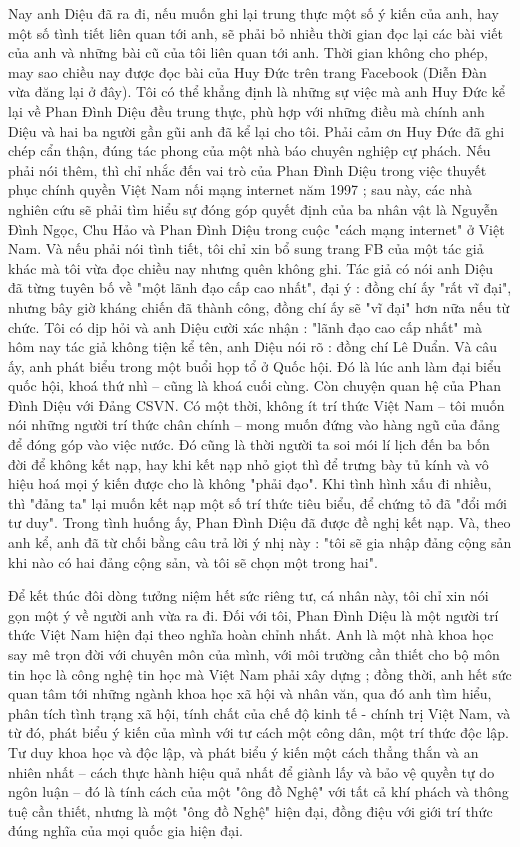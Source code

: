 Nay anh Diệu đã ra đi, nếu muốn ghi lại trung thực một số ý kiến của anh, hay một số tình tiết liên quan tới anh, sẽ phải bỏ nhiều thời gian đọc lại các bài viết của anh và những bài cũ của tôi liên quan tới anh. Thời gian không cho phép, may sao chiều nay được đọc bài của Huy Đức trên trang Facebook (Diễn Đàn vừa đăng lại ở đây). Tôi có thể khẳng định là những sự việc mà anh Huy Đức kể lại về Phan Đình Diệu đều trung thực, phù hợp với những điều mà chính anh Diệu và hai ba người gần gũi anh đã kể lại cho tôi. Phải cảm ơn Huy Đức đã ghi chép cẩn thận, đúng tác phong của một nhà báo chuyên nghiệp cự phách. Nếu phải nói thêm, thì chỉ nhắc đến vai trò của Phan Đình Diệu trong việc thuyết phục chính quyền Việt Nam nối mạng internet năm 1997 ; sau này, các nhà nghiên cứu sẽ phải tìm hiểu sự đóng góp quyết định của ba nhân vật là Nguyễn Đình Ngọc, Chu Hảo và Phan Đình Diệu trong cuộc "cách mạng internet" ở Việt Nam. Và nếu phải nói tình tiết, tôi chỉ xin bổ sung trang FB của một tác giả khác mà tôi vừa đọc chiều nay nhưng quên không ghi. Tác giả có nói anh Diệu đã từng tuyên bố về "một lãnh đạo cấp cao nhất", đại ý : đồng chí ấy "rất vĩ đại", nhưng bây giờ kháng chiến đã thành công, đồng chí ấy sẽ "vĩ đại" hơn nữa nếu từ chức. Tôi có dịp hỏi và anh Diệu cười xác nhận : "lãnh đạo cao cấp nhất" mà hôm nay tác giả không tiện kể tên, anh Diệu nói rõ : đồng chí Lê Duẩn. Và câu ấy, anh phát biểu trong một buổi họp tổ ở Quốc hội. Đó là lúc anh làm đại biểu quốc hội, khoá thứ nhì – cũng là khoá cuối cùng. Còn chuyện quan hệ của Phan Đình Diệu với Đảng CSVN. Có một thời, không ít trí thức Việt Nam – tôi muốn nói những người trí thức chân chính – mong muốn đứng vào hàng ngũ của đảng để đóng góp vào việc nước. Đó cũng là thời người ta soi mói lí lịch đến ba bốn đời để không kết nạp, hay khi kết nạp nhỏ giọt thì để trưng bày tủ kính và vô hiệu hoá mọi ý kiến được cho là không "phải đạo". Khi tình hình xấu đi nhiều, thì "đảng ta" lại muốn kết nạp một số trí thức tiêu biểu, để chứng tỏ đã "đổi mới tư duy". Trong tình huống ấy, Phan Đình Diệu đã được đề nghị kết nạp. Và, theo anh kể, anh đã từ chối bằng câu trả lời ý nhị này : "tôi sẽ gia nhập đảng cộng sản khi nào có hai đảng cộng sản, và tôi sẽ chọn một trong hai".

Để kết thúc đôi dòng tưởng niệm hết sức riêng tư, cá nhân này, tôi chỉ xin nói gọn một ý về người anh vừa ra đi. Đối với tôi, Phan Đình Diệu là một người trí thức Việt Nam hiện đại theo nghĩa hoàn chỉnh nhất. Anh là một nhà khoa học say mê trọn đời với chuyên môn của mình, với môi trường cần thiết cho bộ môn tin học là công nghệ tin học mà Việt Nam phải xây dựng ; đồng thời, anh hết sức quan tâm tới những ngành khoa học xã hội và nhân văn, qua đó anh tìm hiểu, phân tích tình trạng xã hội, tính chất của chế độ kinh tế - chính trị Việt Nam, và từ đó, phát biểu ý kiến của mình với tư cách một công dân, một trí thức độc lập. Tư duy khoa học và độc lập, và phát biểu ý kiến một cách thẳng thắn và an nhiên nhất – cách thực hành hiệu quả nhất để giành lấy và bảo vệ quyền tự do ngôn luận – đó là tính cách của một "ông đồ Nghệ" với tất cả khí phách và thông tuệ cần thiết, nhưng là một "ông đồ Nghệ" hiện đại, đồng điệu với giới trí thức đúng nghĩa của mọi quốc gia hiện đại.

